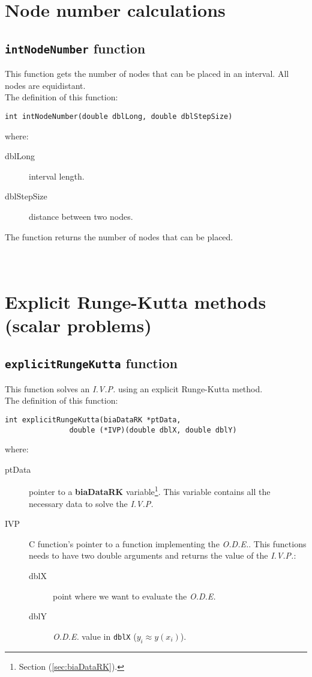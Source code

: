 \section{Node number calculations}

\subsection{\texttt{intNodeNumber} function}

This function gets the number of nodes that can be placed in an interval. All nodes are equidistant.\\

The definition of this function:
%
\begin{verbatim}
int intNodeNumber(double dblLong, double dblStepSize)
\end{verbatim}
%
where:
%
\begin{description}
\item[dblLong] interval length.
\item[dblStepSize] distance between two nodes.
\end{description}

The function returns the number of nodes that can be placed.\\ \\
%
\ \\

\section{Explicit Runge-Kutta methods (scalar problems)}

\subsection{\texttt{explicitRungeKutta} function}

This function solves an \emph{I.V.P.} using an explicit Runge-Kutta method.\\

The definition of this function:
%
\begin{verbatim}
int explicitRungeKutta(biaDataRK *ptData, 
               double (*IVP)(double dblX, double dblY)
\end{verbatim} 
%
where:
%
\begin{description}
\item[ptData] pointer to a \textbf{biaDataRK} variable\footnote{Section (\ref{sec:biaDataRK}).}. This variable contains all the necessary data to solve the \emph{I.V.P.}
\item[IVP] C function's pointer to a function implementing the \emph{O.D.E.}. This functions needs to have two double arguments and returns the value of the \emph{I.V.P.}:
\begin{description}
	\item[dblX] point where we want to evaluate the \emph{O.D.E.}
	\item[dblY] \emph{O.D.E.} value in \texttt{dblX} ($y_i \approx y(x_i)$).
\end{description}
\end{description}

